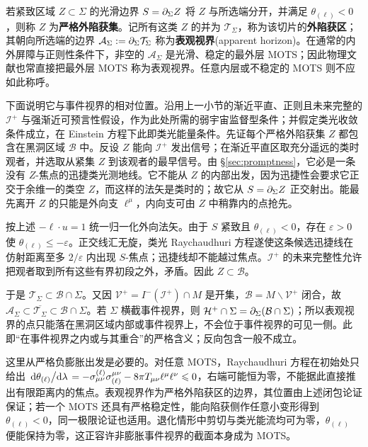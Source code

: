 若紧致区域 $Z\subset\Sigma$ 的光滑边界 $S=\partial_\Sigma Z$ 将 $Z$ 与所选端分开，并满足 $\theta_{(\ell)}<0$，则称 $Z$ 为\textbf{严格外陷获集}。记所有这类 $Z$ 的并为 $\mathcal T_\Sigma$，称为该切片的\textbf{外陷获区}；其朝向所选端的边界 $\mathcal A_\Sigma:=\partial_\Sigma\mathcal T_\Sigma$ 称为\textbf{表观视界}(apparent horizon)。在通常的内外屏障与正则性条件下，非空的 $\mathcal A_\Sigma$ 是光滑、稳定的最外层 MOTS；因此物理文献也常直接把最外层 MOTS 称为表观视界。任意内层或不稳定的 MOTS 则不应如此称呼。

下面说明它与事件视界的相对位置。沿用上一小节的渐近平直、正则且未来完整的 $\mathscr I^+$ 与强渐近可预言性假设，作为此处所需的弱宇宙监督型条件；并假定类光收敛条件成立，在 Einstein 方程下此即类光能量条件。先证每个严格外陷获集 $Z$ 都包含在黑洞区域 $\mathcal B$ 中。反设 $Z$ 能向 $\mathscr I^+$ 发出信号；在渐近平直区取充分遥远的类时观者，并选取从紧集 $Z$ 到该观者的最早信号。由 \S\ref{sec:promptness}，它必是一条没有 $Z$-焦点的迅捷类光测地线。它不能从 $Z$ 的内部出发，因为迅捷性会要求它正交于余维一的类空 $Z$，而这样的法矢是类时的；故它从 $S=\partial_\Sigma Z$ 正交射出。能最先离开 $Z$ 的只能是外向支 $\ell^\mu$，内向支可由 $Z$ 中稍靠内的点抢先。

按上述 $-\ell\cdot u=1$ 统一归一化外向法矢。由于 $S$ 紧致且 $\theta_{(\ell)}<0$，存在 $\varepsilon>0$ 使 $\theta_{(\ell)}\leqslant-\varepsilon$。正交线汇无旋，类光 Raychaudhuri 方程遂使这条候选迅捷线在仿射距离至多 $2/\varepsilon$ 内出现 $S$-焦点；迅捷线却不能越过焦点。$\mathscr I^+$ 的未来完整性允许把观者取到所有这些有界初段之外，矛盾。因此 $Z\subset\mathcal B$。

于是 $\mathcal T_\Sigma\subset\mathcal B\cap\Sigma$。又因 $\mathcal V^+=I^-(\mathscr I^+)\cap M$ 是开集，$\mathcal B=M\backslash\mathcal V^+$ 闭合，故 $\mathcal A_\Sigma\subset\overline{\mathcal T_\Sigma}\subset\mathcal B\cap\Sigma$。若 $\Sigma$ 横截事件视界，则 $\mathcal H^+\cap\Sigma=\partial_\Sigma(\mathcal B\cap\Sigma)$；所以表观视界的点只能落在黑洞区域内部或事件视界上，不会位于事件视界的可见一侧。此即“在事件视界之内或与其重合”的严格含义；反向包含一般不成立。

这里从严格负膨胀出发是必要的。对任意 MOTS，Raychaudhuri 方程在初始处只给出 $\dv*{\theta_{(\ell)}}{\lambda}=-\sigma_{\mu\nu}^{(\ell)}\sigma_{(\ell)}^{\mu\nu}-8\pi T_{\mu\nu}\ell^\mu\ell^\nu\leqslant0$，右端可能恒为零，不能据此直接推出有限距离内的焦点。表观视界作为严格外陷获区的边界，其位置由上述闭包论证保证；若一个 MOTS 还具有严格稳定性，能向陷获侧作任意小变形得到 $\theta_{(\ell)}<0$，同一极限论证也适用。退化情形中剪切与类光能流均可为零，$\theta_{(\ell)}$ 便能保持为零，这正容许非膨胀事件视界的截面本身成为 MOTS。

